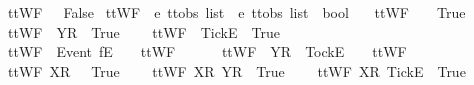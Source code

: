 \begin{isabellebody}
{\ \ {\isachardoublequoteopen}ttWF\ {\isasymsigma}\ {\isacharequal}\ False{\isachardoublequoteclose}%
}%
\isamarkupfalse%
\ ttWF{}\ {\isacharcolon}{\isacharcolon}\ {\isachardoublequoteopen}{\isacharprime}e\ ttobs\ list\ {\isasymRightarrow}\ {\isacharprime}e\ ttobs\ list\ {\isasymRightarrow}\ bool{\isachardoublequoteclose}\ \isanewline
\ \ {\isachardoublequoteopen}ttWF{}\ {\isacharbrackleft}{\isacharbrackright}\ {\isacharbrackleft}{\isacharbrackright}\ {\isacharequal}\ True{\isachardoublequoteclose}\ {\isacharbar}\ \isanewline
\ \ {\isachardoublequoteopen}ttWF{}\ {\isacharbrackleft}{\isacharbrackright}\ {\isacharbrackleft}{\isacharbrackleft}Y{\isacharbrackright}\isactrlsub R{\isacharbrackright}\ {\isacharequal}\ True{\isachardoublequoteclose}\ {\isacharbar}\ \isanewline
\ \ {\isachardoublequoteopen}ttWF{}\ {\isacharbrackleft}{\isacharbrackright}\ {\isacharbrackleft}{\isacharbrackleft}Tick{\isacharbrackright}\isactrlsub E{\isacharbrackright}\ {\isacharequal}\ True{\isachardoublequoteclose}\ {\isacharbar}\ \isanewline
\ \ {\isachardoublequoteopen}ttWF{}\ {\isacharbrackleft}{\isacharbrackright}\ {\isacharparenleft}{\isacharbrackleft}Event\ f{\isacharbrackright}\isactrlsub E\ {\isacharhash}\ {\isasymsigma}{\isacharparenright}\ {\isacharequal}\ ttWF{}\ {\isacharbrackleft}{\isacharbrackright}\ {\isasymsigma}{\isachardoublequoteclose}\ {\isacharbar}\ \isanewline
\ \ {\isachardoublequoteopen}ttWF{}\ {\isacharbrackleft}{\isacharbrackright}\ {\isacharparenleft}{\isacharbrackleft}Y{\isacharbrackright}\isactrlsub R\ {\isacharhash}\ {\isacharbrackleft}Tock{\isacharbrackright}\isactrlsub E\ {\isacharhash}\ {\isasymsigma}{\isacharparenright}\ {\isacharequal}\ ttWF{}\ {\isacharbrackleft}{\isacharbrackright}\ {\isasymsigma}{\isachardoublequoteclose}\ {\isacharbar}\ \isanewline
\ \ {\isachardoublequoteopen}ttWF{}\ {\isacharbrackleft}{\isacharbrackleft}X{\isacharbrackright}\isactrlsub R{\isacharbrackright}\ {\isacharbrackleft}{\isacharbrackright}\ {\isacharequal}\ True{\isachardoublequoteclose}\ {\isacharbar}\ \isanewline
\ \ {\isachardoublequoteopen}ttWF{}\ {\isacharbrackleft}{\isacharbrackleft}X{\isacharbrackright}\isactrlsub R{\isacharbrackright}\ {\isacharbrackleft}{\isacharbrackleft}Y{\isacharbrackright}\isactrlsub R{\isacharbrackright}\ {\isacharequal}\ True{\isachardoublequoteclose}\ {\isacharbar}\ \isanewline
\ \ {\isachardoublequoteopen}ttWF{}\ {\isacharbrackleft}{\isacharbrackleft}X{\isacharbrackright}\isactrlsub R{\isacharbrackright}\ {\isacharbrackleft}{\isacharbrackleft}Tick{\isacharbrackright}\isactrlsub E{\isacharbrackright}\ {\isacharequal}\ True{\isachardoublequoteclose}\ {\isacharbar}\ \isanewline

\end{isabellebody}
